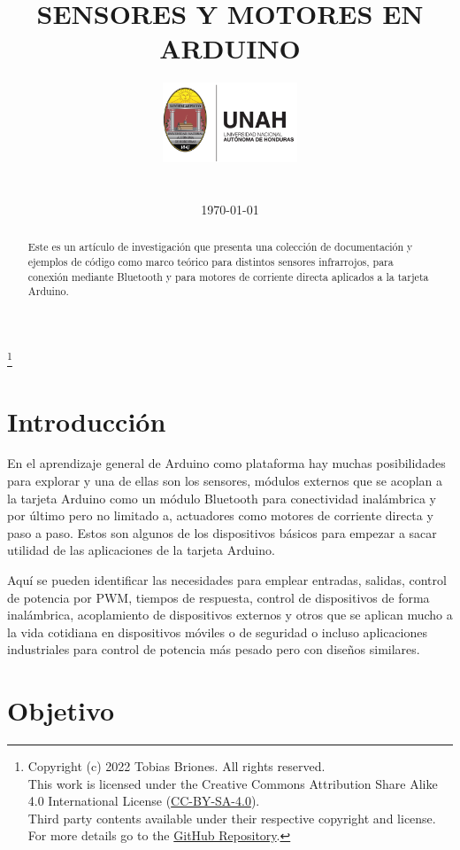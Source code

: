 \documentclass[conference]{IEEEtran}
\title{SENSORES Y MOTORES EN ARDUINO}
\author{
    \includegraphics[width = 40mm]{images/logo-unah}\\[8ex]
    \IEEEauthorblockN{Tobias Briones}
    \IEEEauthorblockN{tobias.briones@unah.hn}
    \IEEEauthorblockA{\textit{Universidad Nacional Autónoma de Honduras} \\
    \textit{Ingeniería de Sistemas} \\
    \textit{I PAC 2022} \\
    \textit{IS911-MICROPROCESADORES}} \\\vspace*{20pt} \normalsize  \\
    \today
}
\newcommand\blfootnote[1]{%
    \begingroup
    \renewcommand\thefootnote{}\footnote{#1}%
    \addtocounter{footnote}{-1}%
    \endgroup
}
\begin{document}
    \maketitle

    \begin{abstract}
        Este es un artículo de investigación que presenta una colección de documentación y ejemplos de código como marco teórico para distintos sensores infrarrojos, para conexión mediante Bluetooth y para motores de corriente directa aplicados a la tarjeta Arduino.
    \end{abstract}

    \tableofcontents

    \blfootnote{
        Copyright (c) 2022 Tobias Briones. All rights reserved. \\
        This work is licensed under the Creative Commons Attribution Share Alike 4.0 International License (\href{https://spdx.org/licenses/CC-BY-SA-4.0}{CC-BY-SA-4.0}). \\
        Third party contents available under their respective copyright and license.\\
        For more details go to the \href{https://github.com/tobiasbriones/cp-unah-is911-microprocessors}{GitHub Repository}.}

    \section{Introducción}

    En el aprendizaje general de Arduino como plataforma hay muchas posibilidades para explorar y una de ellas son los sensores, módulos externos que se acoplan a la tarjeta Arduino como un módulo Bluetooth para conectividad inalámbrica y por último pero no limitado a, actuadores como motores de corriente directa y paso a paso. Estos son algunos de los dispositivos básicos para empezar a sacar utilidad de las aplicaciones de la tarjeta Arduino.

    \bigbreak

    Aquí se pueden identificar las necesidades para emplear entradas, salidas, control de potencia por PWM, tiempos de respuesta, control de dispositivos de forma inalámbrica, acoplamiento de dispositivos externos y otros que se aplican mucho a la vida cotidiana en dispositivos móviles o de seguridad o incluso aplicaciones industriales para control de potencia más pesado pero con diseños similares.

    \section{Objetivo}
\end{document}
